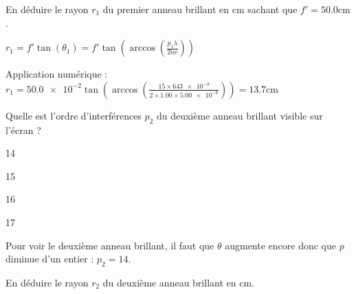 

\begin{enonce}
En déduire le rayon $r_1$ du premier anneau brillant en $\si{\centi\metre}$ sachant que $f'=\num{50,0}\si{\centi\metre}$.
\end{enonce}
			
			
\begin{corrige}
	$r_1=f' \tan(\theta_1)=f' \tan\left(\arccos\left( \frac{p_1 \lambda}{2ne}\right)\right)$

	Application numérique : $r_1=\num{50.0e-2}\tan\left(\arccos\left( \frac{15 \times \num{643e-9}}{2 \times \num{1.00} \times \num{5.00e-6}}\right)\right)=\num{13.7}\si{\centi\metre}$
\end{corrige}
			


\begin{enonce}
	Quelle est l'ordre d'interférences $p_2$ du deuxième anneau brillant visible sur l'écran ?
	\begin{listeQCM4Colonnes}
		\item 14
		\item 15
		\item 16
		\item 17
	\end{listeQCM4Colonnes}
	\bigskip
\end{enonce}
				
\reponse{\reponseA{}}
				
\begin{corrige}
	Pour voir le deuxième anneau brillant, il faut que $\theta$ augmente encore donc que $p$ diminue d'un entier : $p_2=14$.
\end{corrige}
				


\begin{enonce}
En déduire le rayon $r_2$ du deuxième anneau brillant en $\si{\centi\metre}$.
\end{enonce}
				
